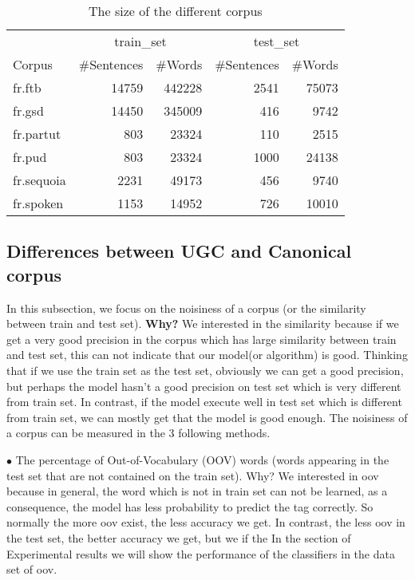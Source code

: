 \documentclass{article}
\begin{document}
\begin{table}[h]
    \caption{The size of the different corpus}
    \vspace{5pt}
    \centering
    
\begin{tabular}{|l|rr|rr|}
\hline
\multicolumn{1}{|c|}{\ } & \multicolumn{2}{c|}{train\_set} & \multicolumn{2}{c|}{test\_set}\\ 
\cline{2-5}
Corpus & \#Sentences & \#Words & \#Sentences & \#Words\\
\hline
fr.ftb     & 14759 & 442228 & 2541 & 75073 \\
fr.gsd     & 14450 & 345009 & 416  & 9742\\
fr.partut  & 803   & 23324  & 110  & 2515\\
fr.pud     & 803   & 23324  & 1000 & 24138\\
fr.sequoia & 2231  & 49173  & 456  & 9740\\
fr.spoken  & 1153  & 14952  & 726  & 10010\\
\hline
\end{tabular}
\label{table_size}
\end{table}


\subsection{Differences between UGC and Canonical corpus}
In this subsection, we focus on the noisiness of a corpus (or the similarity between train and test set).  \textbf{Why?} We interested in the similarity because if we get a very good precision in the corpus which has large similarity between train and test set, this can not indicate that our model(or algorithm) is good. Thinking that if we use the train set as the test set, obviously we can get a good precision, but perhaps the model hasn't a good precision on test set which is very different from train set. In contrast, if the model execute well in test set which is different from train set, we can mostly get that the model is good enough. The noisiness of a corpus can be measured in the 3 following methods.

$\bullet$ The percentage of Out-of-Vocabulary (OOV) words (words appearing in the test set that are not contained on the train set).
\textsf{Why?} We interested in oov because in general, the word which is not in train set can not be learned, as a consequence, the model has less probability to predict the tag correctly. So normally the more oov exist, the less accuracy we get. In contrast, the less oov in the test set, the better accuracy we get, but we if the  In the section of Experimental results we will show the performance of the classifiers in the data set of oov.
\end{document}
